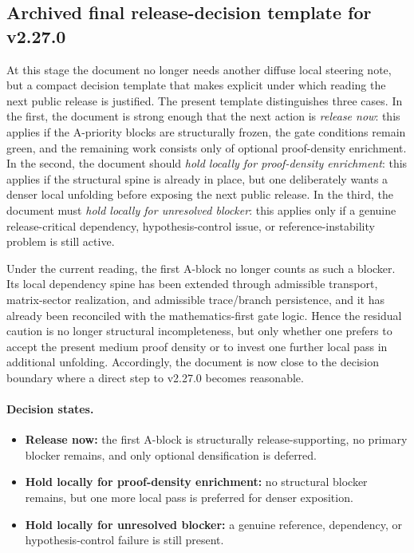 \subsection*{Archived final release-decision template for v2.27.0}
At this stage the document no longer needs another diffuse local steering note, but a compact decision template that makes explicit under which reading the next public release is justified. The present template distinguishes three cases. In the first, the document is strong enough that the next action is \emph{release now}: this applies if the A-priority blocks are structurally frozen, the gate conditions remain green, and the remaining work consists only of optional proof-density enrichment. In the second, the document should \emph{hold locally for proof-density enrichment}: this applies if the structural spine is already in place, but one deliberately wants a denser local unfolding before exposing the next public release. In the third, the document must \emph{hold locally for unresolved blocker}: this applies only if a genuine release-critical dependency, hypothesis-control issue, or reference-instability problem is still active.

Under the current reading, the first A-block no longer counts as such a blocker. Its local dependency spine has been extended through admissible transport, matrix-sector realization, and admissible trace/branch persistence, and it has already been reconciled with the mathematics-first gate logic. Hence the residual caution is no longer structural incompleteness, but only whether one prefers to accept the present medium proof density or to invest one further local pass in additional unfolding. Accordingly, the document is now close to the decision boundary where a direct step to v2.27.0 becomes reasonable.

\paragraph{Decision states.}
\begin{itemize}[leftmargin=2em]
  \item \textbf{Release now:} the first A-block is structurally release-supporting, no primary blocker remains, and only optional densification is deferred.
  \item \textbf{Hold locally for proof-density enrichment:} no structural blocker remains, but one more local pass is preferred for denser exposition.
  \item \textbf{Hold locally for unresolved blocker:} a genuine reference, dependency, or hypothesis-control failure is still present.
\end{itemize}

